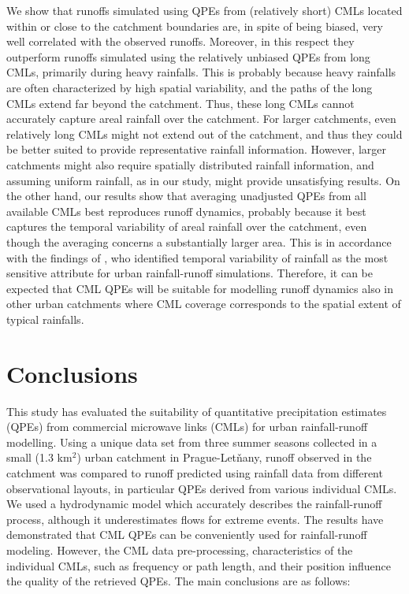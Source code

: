 \documentclass{ctuthesis}\usepackage[]{graphicx}\usepackage[]{color}
\begin{document}
We show that runoffs simulated using QPEs from (relatively short) CMLs located within or close to the catchment boundaries are, in spite of being biased, very well correlated with the observed runoffs. Moreover, in this respect they outperform runoffs simulated using the relatively unbiased QPEs from long CMLs, primarily during heavy rainfalls. This is probably because heavy rainfalls are often characterized by high spatial variability, and the paths of the long CMLs extend far beyond the catchment. Thus, these long CMLs cannot accurately capture areal rainfall over the catchment. For larger catchments, even relatively long CMLs might not extend out of the catchment, and thus they could be better suited to provide representative rainfall information. However, larger catchments might also require spatially distributed rainfall information, and assuming uniform rainfall, as in our study, might provide unsatisfying results. On the other hand, our results show that averaging unadjusted QPEs from all available CMLs best reproduces runoff dynamics, probably because it best captures the temporal variability of areal rainfall over the catchment, even though the averaging concerns a substantially larger area. This is in accordance with the findings of \cite{ochoa-rodriguezImpactSpatialTemporal2015}, who identified temporal variability of rainfall as the most sensitive attribute for urban rainfall-runoff simulations. Therefore, it can be expected that CML QPEs will be suitable for modelling runoff dynamics also in other urban catchments where CML coverage corresponds to the spatial extent of typical rainfalls.

\section{Conclusions}

This study has evaluated the suitability of quantitative precipitation estimates (QPEs) from commercial microwave links (CMLs) for urban rainfall-runoff modelling. Using a unique data set from three summer seasons collected in a small (1.3 km$^2$) urban catchment in Prague-Letňany, runoff observed in the catchment was compared to runoff predicted using rainfall data from different observational layouts, in particular QPEs derived from various individual CMLs. We used a hydrodynamic model which accurately describes the rainfall-runoff process, although it underestimates flows for extreme events. The results have demonstrated that CML QPEs can be conveniently used for rainfall-runoff modeling. However, the CML data pre-processing, characteristics of the individual CMLs, such as frequency or path length, and their position influence the quality of the retrieved QPEs. The main conclusions are as follows:
\end{document}
